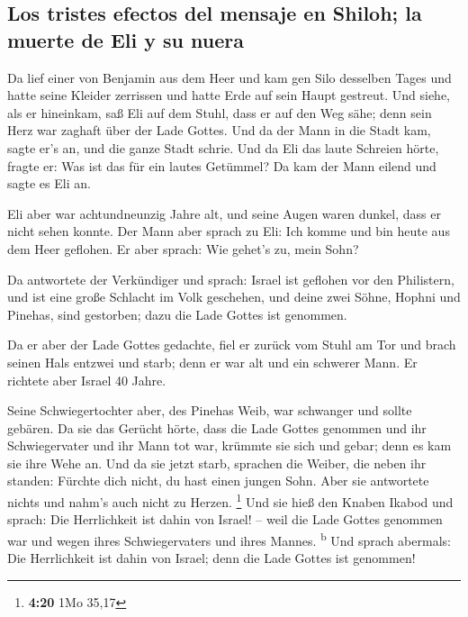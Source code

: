 \hypertarget{los-tristes-efectos-del-mensaje-en-shiloh-la-muerte-de-eli-y-su-nuera}{%
\subsection{Los tristes efectos del mensaje en Shiloh; la muerte de Eli
y su
nuera}\label{los-tristes-efectos-del-mensaje-en-shiloh-la-muerte-de-eli-y-su-nuera}}

 Da lief einer von Benjamin aus dem Heer und kam gen Silo
desselben Tages und hatte seine Kleider zerrissen und hatte Erde auf
sein Haupt gestreut.  Und siehe, als er hineinkam, saß
Eli auf dem Stuhl, dass er auf den Weg sähe; denn sein Herz war zaghaft
über der Lade Gottes. Und da der Mann in die Stadt kam, sagte er's an,
und die ganze Stadt schrie.  Und da Eli das laute
Schreien hörte, fragte er: Was ist das für ein lautes Getümmel? Da kam
der Mann eilend und sagte es Eli an.

 Eli aber war achtundneunzig Jahre alt, und seine Augen
waren dunkel, dass er nicht sehen konnte.  Der Mann aber
sprach zu Eli: Ich komme und bin heute aus dem Heer geflohen. Er aber
sprach: Wie gehet's zu, mein Sohn?

 Da antwortete der Verkündiger und sprach: Israel ist
geflohen vor den Philistern, und ist eine große Schlacht im Volk
geschehen, und deine zwei Söhne, Hophni und Pinehas, sind gestorben;
dazu die Lade Gottes ist genommen.

 Da er aber der Lade Gottes gedachte, fiel er zurück vom
Stuhl am Tor und brach seinen Hals entzwei und starb; denn er war alt
und ein schwerer Mann. Er richtete aber Israel 40 Jahre.

 Seine Schwiegertochter aber, des Pinehas Weib, war
schwanger und sollte gebären. Da sie das Gerücht hörte, dass die Lade
Gottes genommen und ihr Schwiegervater und ihr Mann tot war, krümmte sie
sich und gebar; denn es kam sie ihre Wehe an.  Und da sie
jetzt starb, sprachen die Weiber, die neben ihr standen: Fürchte dich
nicht, du hast einen jungen Sohn. Aber sie antwortete nichts und nahm's
auch nicht zu Herzen. \footnote{\textbf{4:20} 1Mo 35,17} 
Und sie hieß den Knaben Ikabod und sprach: Die Herrlichkeit ist dahin
von Israel! -- weil die Lade Gottes genommen war und wegen ihres
Schwiegervaters und ihres Mannes. \textsuperscript{b} 
Und sprach abermals: Die Herrlichkeit ist dahin von Israel; denn die
Lade Gottes ist genommen!

